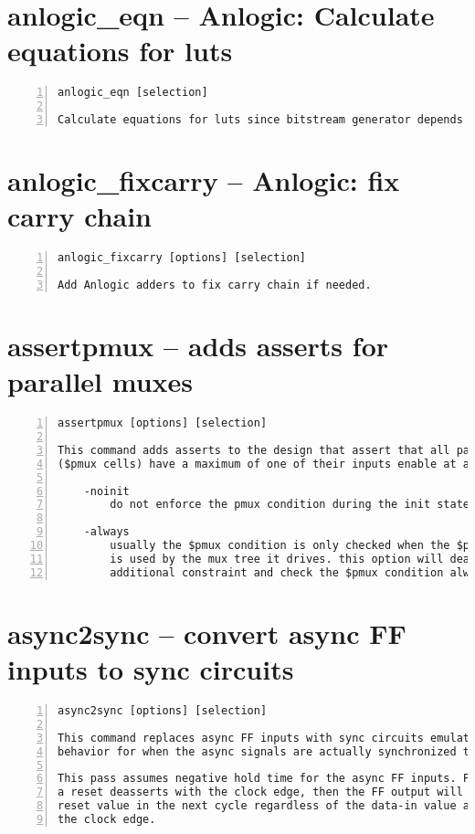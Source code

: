 \section{anlogic\_eqn -- Anlogic: Calculate equations for luts}
\label{cmd:anlogic_eqn}
\begin{lstlisting}[numbers=left,frame=single]
    anlogic_eqn [selection]

Calculate equations for luts since bitstream generator depends on it.
\end{lstlisting}

\section{anlogic\_fixcarry -- Anlogic: fix carry chain}
\label{cmd:anlogic_fixcarry}
\begin{lstlisting}[numbers=left,frame=single]
    anlogic_fixcarry [options] [selection]

Add Anlogic adders to fix carry chain if needed.
\end{lstlisting}

\section{assertpmux -- adds asserts for parallel muxes}
\label{cmd:assertpmux}
\begin{lstlisting}[numbers=left,frame=single]
    assertpmux [options] [selection]

This command adds asserts to the design that assert that all parallel muxes
($pmux cells) have a maximum of one of their inputs enable at any time.

    -noinit
        do not enforce the pmux condition during the init state

    -always
        usually the $pmux condition is only checked when the $pmux output
        is used by the mux tree it drives. this option will deactivate this
        additional constraint and check the $pmux condition always.
\end{lstlisting}

\section{async2sync -- convert async FF inputs to sync circuits}
\label{cmd:async2sync}
\begin{lstlisting}[numbers=left,frame=single]
    async2sync [options] [selection]

This command replaces async FF inputs with sync circuits emulating the same
behavior for when the async signals are actually synchronized to the clock.

This pass assumes negative hold time for the async FF inputs. For example when
a reset deasserts with the clock edge, then the FF output will still drive the
reset value in the next cycle regardless of the data-in value at the time of
the clock edge.
\end{lstlisting}

